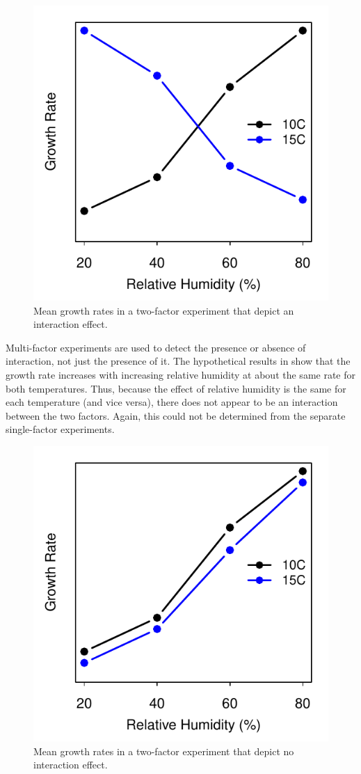 \documentclass[10pt,openany]{book}\usepackage[]{graphicx}\usepackage[]{color}
\newenvironment{knitrout}{}{} %
\begin{document}
\begin{knitrout}
\color{fgcolor}\begin{figure}[hbtp]

{\centering \includegraphics[width=.4\linewidth]{Figs/ExpDInt-1} 

}

\caption[Mean growth rates in a two-factor experiment that depict an interaction effect]{Mean growth rates in a two-factor experiment that depict an interaction effect.}\label{fig:ExpDInt}
\end{figure}


\end{knitrout}

Multi-factor experiments are used to detect the presence or absence of interaction, not just the presence of it.  The hypothetical results in  show that the growth rate increases with increasing relative humidity at about the same rate for both temperatures.  Thus, because the effect of relative humidity is the same for each temperature (and vice versa), there does not appear to be an interaction between the two factors.  Again, this could not be determined from the separate single-factor experiments.

\begin{knitrout}
\color{fgcolor}\begin{figure}[hbtp]

{\centering \includegraphics[width=.4\linewidth]{Figs/ExpDNoInt-1} 

}

\caption[Mean growth rates in a two-factor experiment that depict no interaction effect]{Mean growth rates in a two-factor experiment that depict no interaction effect.}\label{fig:ExpDNoInt}
\end{figure}


\end{knitrout}
\end{document}
